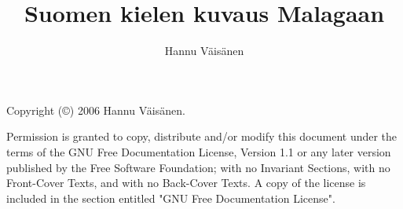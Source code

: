 \documentclass[10pt]{article}
\begin{document}
\title{Suomen kielen kuvaus Malagaan}
\author{Hannu Väisänen}

\maketitle
\newpage

Copyright (©)  2006 Hannu Väisänen.

Permission is granted to copy, distribute and/or modify this document
under the terms of the GNU Free Documentation License, Version 1.1 or
any later version published by the Free Software Foundation; with no
Invariant Sections, with no Front-Cover Texts, and with no Back-Cover
Texts. A copy of the license is included in the section entitled "GNU
Free Documentation License".

\newpage


\clearpage


\clearpage


\clearpage


\clearpage


\clearpage



\newpage

\newpage
\tableofcontents
\end{document}
